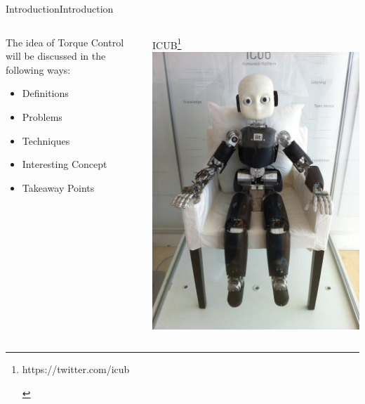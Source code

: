 \documentclass{beamer}
\begin{document}
\begin{frame}{Introduction}{Introduction}
\begin{columns}
    \begin{column}{0.47\textwidth}
The idea of Torque Control will be discussed in the following ways:
\begin{itemize}
	\item Definitions
	\item Problems
	\item Techniques  
	\item Interesting Concept
	\item Takeaway Points
\end{itemize}	
    \end{column}
    \begin{column}{0.5\textwidth}
    		\centering
    		ICUB\footnote[frame]{\begin{tiny}
    		https://twitter.com/icub
    		\end{tiny}}
        \includegraphics[scale=.15]{./images/creepy_cub.jpg}
    \end{column}
	
\end{columns}  

\end{frame}
\end{document}
